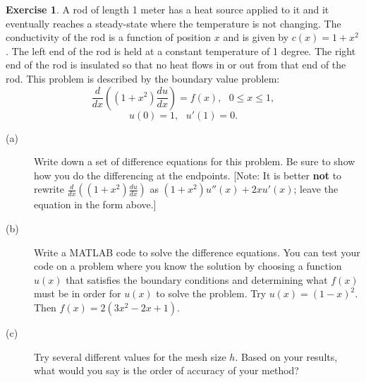 \documentclass[12pt]{article}
\theoremstyle{definition}
\newtheorem{exer}{Exercise}
\theoremstyle{remark}
\begin{document}
\begin{exer}
    A rod of length 1 meter has a heat source applied to it and it eventually
reaches a steady-state where the temperature is not changing.  The
conductivity of the rod is a function of position $x$ and is given by
$c(x) = 1 + x^2$.  The left end of the rod is held at a constant
temperature of 1 degree.  The right end of the rod is insulated so
that no heat flows in or out from that end of the rod.  This problem is
described by the boundary value problem:
\[
\frac{d}{dx} \left( (1 + x^2 ) \frac{du}{dx} \right) = f(x) ,~~~ 
0 \leq x \leq 1 ,
\]
\[
u(0) = 1,~~~u'(1) = 0 .
\]
\begin{description}
\item[(a)] Write down a set of difference equations for this problem.
Be sure to show how you do the differencing at the endpoints.
[Note:  It is better {\bf not} to rewrite 
$\frac{d}{dx} ( ( 1+ x^2 ) \frac{du}{dx} )$ as $(1 + x^2 ) u'' (x) + 2x u'(x)$;
leave the equation in the form above.]
\item[(b)] Write a MATLAB code to solve the difference equations.
You can test your code on a problem where you know the solution
by choosing a function $u(x)$ that satisfies the boundary conditions
and determining what $f(x)$ must be in order for $u(x)$ to solve the
problem.  Try $u(x) = (1-x )^2$.  Then $f(x) = 2( 3 x^2 - 2 x + 1 )$.
\item[(c)] Try several different values for the mesh size $h$.  Based
on your results, what would you say is the order of accuracy of your
method?
\end{description}
\end{exer}
\end{document}
